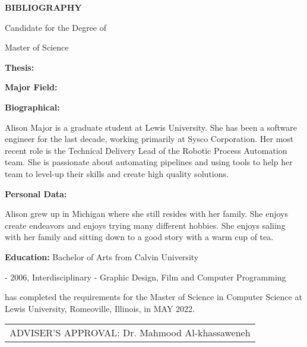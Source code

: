 \begin{singlespace}
  \begin{center}
    \large
    \textbf{BIBLIOGRAPHY}
    
    \vspace{0.5cm}
    \textbf{\paperAuthor}
  
    \vspace{0.5cm}
    Candidate for the Degree of
  
    \vspace{0.5cm}
    Master of Science
  \end{center}
  
  \vspace{1cm}
  \noindent
  \textbf{Thesis:} \MakeUppercase{\paperTitle}
  
  \vspace{0.5cm}
  \noindent
  \textbf{Major Field:} \authorConcentration
  
  \vspace{0.5cm}
  \noindent
  \textbf{Biographical:}
  
  \begin{footnotesize}
    \noindent
    Alison Major is a graduate student at Lewis University. She has been a software engineer for the last decade, working primarily at Sysco Corporation. Her most recent role is the Technical Delivery Lead of the Robotic Process Automation team. She is passionate about automating pipelines and using tools to help her team to level-up their skills and create high quality solutions.
  \end{footnotesize}

  \vspace{0.5cm}
  \noindent
  \textbf{Personal Data:}

  \begin{footnotesize}
    \noindent
    Alison grew up in Michigan where she still resides with her family. She enjoys create endeavors and enjoys trying many different hobbies. She enjoys saliing with her family and sitting down to a good story with a warm cup of tea.
  \end{footnotesize}
  
  \vspace{0.5cm}
  \noindent
  \textbf{Education:} Bachelor of Arts from Calvin University
  
  \begin{footnotesize}
     - 2006, Interdisciplinary - Graphic Design, Film and Computer Programming
  \end{footnotesize}
  
  \vspace{1.5cm}
  \noindent
  \paperAuthor \space has completed the requirements for the Master of Science in Computer Science at Lewis University, Romeoville, Illinois, in MAY 2022.
  
  \vspace{1.5cm}
  \noindent
  \begin{tabular}{p{}}
    \hline
    ADVISER'S APPROVAL: Dr. Mahmood Al-khassaweneh \\ 
  \end{tabular}  
\end{singlespace}
